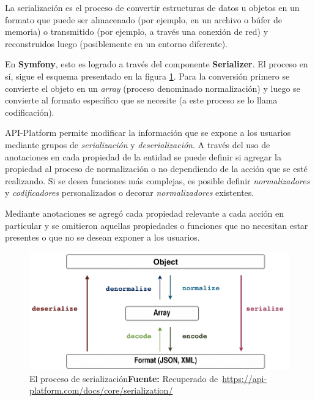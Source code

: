 

La serialización es el proceso de convertir estructuras de datos u objetos en un formato que puede ser almacenado (por ejemplo, en un archivo o búfer de memoria)
o transmitido (por ejemplo, a través una conexión de red) y reconstruidos luego (posiblemente en un entorno diferente).~\parencite{serialization}

En \textbf{Symfony}, esto es logrado a través del componente \textbf{Serializer}. El proceso en sí, sigue el esquema presentado en la figura
\ref{fig:image/serializationWorkflow}\@.
Para la conversión primero se convierte el objeto en un \textit{array} (proceso denominado
normalización) y luego se convierte al formato específico que se necesite (a este proceso se lo llama codificación).

API-Platform permite modificar la información que se expone a los usuarios mediante grupos de \textit{serialización} y \textit{deserialización}\@. A través del uso de anotaciones
en cada propiedad de la entidad se puede definir si agregar la propiedad al proceso de normalización o no dependiendo de la acción que se esté realizando.
Si se desea funciones más complejas, es posible definir \textit{normalizadores} y \textit{codificadores} personalizados o decorar \textit{normalizadores} existentes.
~\parencite{api-platform-serialization}


Mediante anotaciones se agregó cada propiedad relevante a cada acción en particular y se omitieron aquellas propiedades o funciones que no necesitan estar
presentes o que no se desean exponer a los usuarios.



\begin{figure}[h]
    \includegraphics[width=1\linewidth]{image/serializationWorkflow.png}
    \caption{El proceso de serialización\newline \textbf{Fuente:} Recuperado de~\url{https://api-platform.com/docs/core/serialization/}}
    \label{fig:image/serializationWorkflow}
\end{figure}





